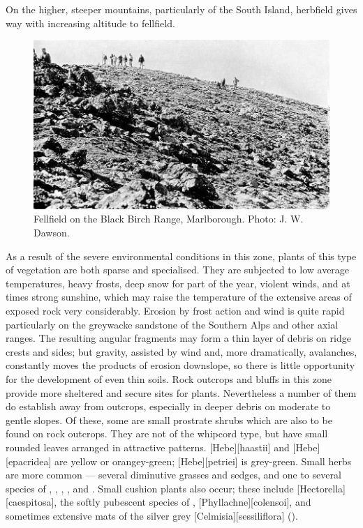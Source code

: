 On the higher, steeper mountains, particularly of the South Island, herbfield gives way with increasing altitude to fellfield.
\begin{figure}[!b]
	\includegraphics[width=\textwidth]{graphics/figure105fellfield.jpg}
	\centering
	\caption[Fellfield on the Black Birch Range]{Fellfield on the Black Birch Range, Marlborough.
	Photo: J. W. Dawson.}%
	\label{fig:105fellfield}
\end{figure}
As a result of the severe environmental conditions in this zone, plants of this type of vegetation are both sparse and specialised.
They are subjected to low average temperatures, heavy frosts, deep snow for part of the year, violent winds, and at times strong sunshine, which may raise the temperature of the extensive areas of exposed rock very considerably.
Erosion by frost action and wind is quite rapid particularly on the greywacke sandstone of the Southern Alps and other axial ranges.
The resulting angular fragments may form a thin layer of debris on ridge crests and sides; but gravity, assisted by wind and, more dramatically, avalanches, constantly moves the products of erosion downslope, so there is little opportunity for the development of even thin soils.
Rock outcrops and bluffs in this zone provide more sheltered and secure sites for plants.
Nevertheless a number of them do establish away from outcrops, especially in deeper debris on moderate to gentle slopes.
Of these, some are small prostrate  shrubs which are also to be found on rock outcrops.
They are not of the whipcord type, but have small rounded leaves arranged in attractive patterns. [Hebe][haastii] and [Hebe][epacridea] are yellow or orangey-green; [Hebe][petriei] is grey-green.
Small herbs are more common --- several diminutive grasses and sedges, and one to several species of , , , ,  and .
Small cushion plants also occur; these include [Hectorella][caespitosa], the softly pubescent species of , [Phyllachne][colensoi], and sometimes extensive mats of the silver grey [Celmisia][sessiliflora] ().

